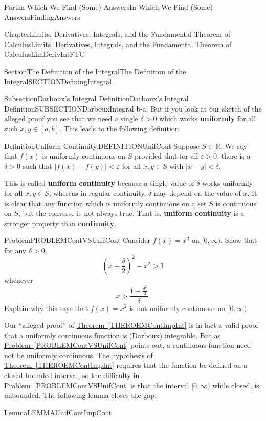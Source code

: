 \documentclass[oneside,10pt,]{book}
\newcommand{\xreffont}{\relax}
\newcommand{\terminology}[1]{\textbf{#1}}
\numberwithin{equation}{part}
\newcommand{\eps}{\varepsilon}
\newcommand{\RR}{\mathbb {R}}
\newcommand{\lt}{<}
\begin{document}
\begin{partptx}{Part}{In Which We Find (Some) Answers}{}{In Which We Find (Some) Answers}{}{}{FindingAnswers}
\begin{chapterptx}{Chapter}{Limits, Derivatives, Integrals, and the Fundamental Theorem of Calculus}{}{Limits, Derivatives, Integrals, and the Fundamental Theorem of Calculus}{}{}{LimDerivIntFTC}
\begin{sectionptx}{Section}{The Definition of the Integral}{}{The Definition of the Integral}{}{}{SECTIONDefiningIntegral}
\begin{subsectionptx}{Subsection}{Darboux's Integral Definition}{}{Darboux's Integral Definition}{}{}{SUBSECTIONDarbouxIntegral}
{}{b-a}\). But if you look at our sketch of the alleged proof you see that we need a single \(\delta >0\) which works \terminology{uniformly} for all such \(x, y\in [a,b]\).  This leads to the following definition.%
\begin{definition}{Definition}{Uniform Continuity.}{DEFINITIONUnifCont}%
%
%
Suppose \(S\subset \RR\).  We say that \(f(x)\) is uniformly continuous on \(S\) provided that for all \(\eps
>0\), there is a \(\delta >0\) such that \(\left|f\left(x\right)-f\left(y\right)\right|\lt \eps \) for all \(x, y\in S\) with \(\left|x-y\right|\lt \delta \).%
\end{definition}
This is called \terminology{uniform continuity} because  a single value of \(\delta \)  works uniformly for all \(x,y\in S\), whereas in regular continuity,  \(\delta \) may depend on the value of \(x\).  It is  clear that any function which is uniformly continuous on a set \(S\) is continuous on \(S\), but   the converse is not always true. That is,  \terminology{uniform continuity} is a stronger property than \terminology{continuity}.%
\begin{problem}{Problem}{}{PROBLEMContVSUnifCont}%
Consider \(f(x)=x^2\) on \([0,\infty )\).  Show that for any \(\delta >0\),%
\begin{equation*}
\left(x+\frac{\delta }{2}\right)^2-x^2>1
\end{equation*}
whenever%
\begin{equation*}
x>\frac{1-\frac{{\delta }^2}{4}}{\delta }\text{.}
\end{equation*}
Explain why this says that \(f\left(x\right)=x^2\) is not uniformly continuous on \([0,\infty )\).%
\end{problem}
Our ``alleged proof'' of \hyperref[THEROEMContImpInt]{Theorem~{\xreffont\ref{THEROEMContImpInt}}} is in fact a valid proof that a uniformly continuous function is (Darboux) integrable.  But as \hyperref[PROBLEMContVSUnifCont]{Problem~{\xreffont\ref{PROBLEMContVSUnifCont}}} points out, a continuous function need not be uniformly continuous.  The hypothesis of \hyperref[THEROEMContImpInt]{Theorem~{\xreffont\ref{THEROEMContImpInt}}} requires that the function be defined on a closed bounded interval, so the difficulty in \hyperref[PROBLEMContVSUnifCont]{Problem~{\xreffont\ref{PROBLEMContVSUnifCont}}} is that the interval \([0,\infty)\) while closed, is unbounded.  The following lemma closes the gap.    %
\begin{lemma}{Lemma}{}{}{LEMMAUnifContImpCont}%

\end{lemma}
\end{subsectionptx}
\end{sectionptx}
\end{chapterptx}
\end{partptx}
\end{document}
